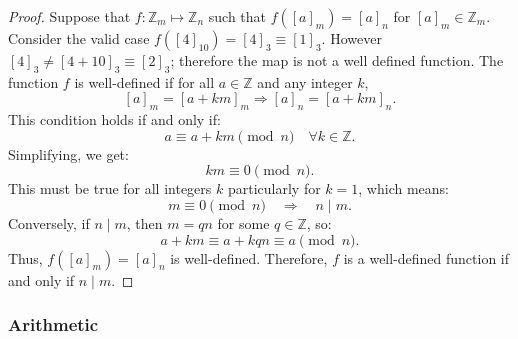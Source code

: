 \documentclass[12pt]{article}
\numberwithin{problem}{section} %
\theoremstyle{remark}  %
\newenvironment{answer}
    {\begin{adjustwidth}{0pt}{0pt}}
    {\end{adjustwidth}}
\begin{document}
    \begin{answer}
        \begin{proof}
            Suppose that $f\operatorname{:}\mathbb{Z}_m\mapsto \mathbb{Z}_n$ such that $f([a]_m)=[a]_n$ for $[a]_m\in \mathbb{Z}_m$. Consider the valid case $f([4]_{10})=[4]_{3}\equiv[1]_{3}$. However $[4]_{3}\neq [4 + 10]_{3}\equiv [2]_3$; therefore the map is not a well defined function. The function $f$ is well-defined if for all $a \in \mathbb{Z}$ and any integer $k$, $$
                [a]_m = [a+km]_m \Rightarrow [a]_n = [a+km]_n.
            $$ This condition holds if and only if: $$
                a \equiv a + km \pmod{n} \quad \forall k \in \mathbb{Z}.
            $$ Simplifying, we get: $$
                km \equiv 0 \pmod{n}.
            $$ This must be true for all integers $k$ particularly for $k = 1$, which means: $$
                m \equiv 0 \pmod{n} \quad \Rightarrow \quad n \mid m.
            $$ Conversely, if $n \mid m$, then $m = qn$ for some $q \in \mathbb{Z}$, so: $$
                a + km \equiv a + kqn \equiv a \pmod{n}.
            $$
            Thus, $f([a]_m) = [a]_n$ is well-defined. Therefore, $f$ is a well-defined function if and only if $n \mid m$.
        \end{proof}
    \end{answer}

\subsubsection{Arithmetic}
\end{document}
